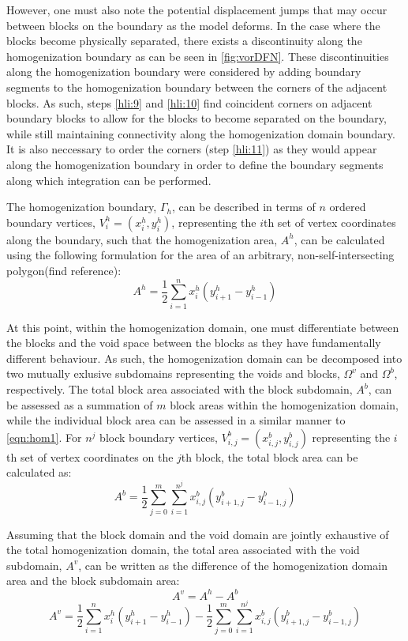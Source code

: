 However, one must also note the potential displacement jumps that may occur between blocks on the boundary as the model deforms. In the case where the blocks become physically separated, there exists a discontinuity along the homogenization boundary as can be seen in \ref{fig:vorDFN}. These discontinuities along the homogenization boundary were considered by adding boundary segments to the homogenization boundary between the corners of the adjacent blocks. As such, steps \ref{hli:9} and \ref{hli:10} find coincident corners on adjacent boundary blocks to allow for the blocks to become separated on the boundary, while still maintaining connectivity along the homogenization domain boundary. It is also neccessary to order the corners (step \ref{hli:11}) as they would appear along the homogenization boundary in order to define the boundary segments along which integration can be performed. 

The homogenization boundary, $\Gamma_{h}$, can be described in terms of $n$ ordered boundary vertices, $V_{i}^{h} = (x_{i}^{h}, y_{i}^{h})$, representing the $i$th set of vertex coordinates along the boundary, such that the homogenization area, $A^h$, can be calculated using the following formulation for the area of an arbitrary, non-self-intersecting polygon(find reference):
\begin{equation}
\label{eqn:hom1}
A^h = \dfrac{1}{2} \sum_{i=1}^{n}x_i^h(y_{i+1}^h-y_{i-1}^h)
\end{equation}

At this point, within the homogenization domain, one must differentiate between the blocks and the void space between the blocks as they have fundamentally different behaviour. As such, the homogenization domain can be decomposed into two mutually exlusive subdomains representing the voids and blocks, $\Omega^v$ and $\Omega^b$, respectively. The total block area associated with the block subdomain, $A^b$, can be assessed as a summation of $m$ block areas within the homogenization domain, while the individual block area can be assessed in a similar manner to \ref{eqn:hom1}. For $n^j$ block boundary vertices, $V_{i,j}^{b} = (x_{i,j}^{b}, y_{i,j}^{b})$ representing the $i$th set of vertex coordinates on the $j$th block, the total block area can be calculated as:
\begin{equation}
\label{eqn:hom2}
A^b = \dfrac{1}{2} \sum_{j=0}^{m} \sum_{i=1}^{n^j} x_{i,j}^b(y_{i+1,j}^b-y_{i-1,j}^b)
\end{equation}

Assuming that the block domain and the void domain are jointly exhaustive of the total homogenization domain, the total area associated with the void subdomain, $A^v$, can be written as the difference of the homogenization domain area and the block subdomain area:
\begin{equation}
\label{eqn:hom3}
A^v = A^h - A^b
\end{equation}
\begin{equation}
\label{eqn:hom4}
A^v = \dfrac{1}{2} \sum_{i=1}^{n}x_i^h(y_{i+1}^h-y_{i-1}^h) - \dfrac{1}{2} \sum_{j=0}^{m} \sum_{i=1}^{n^j} x_{i,j}^b(y_{i+1,j}^b-y_{i-1,j}^b)
\end{equation}



